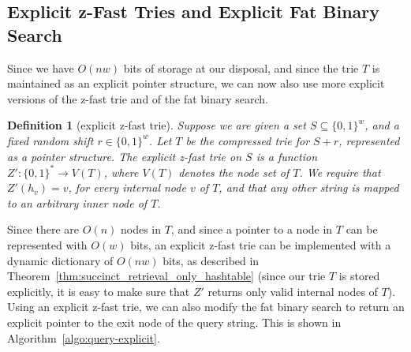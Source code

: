 \documentclass[a4paper,11pt]{article}
\newtheorem{definition}[theorem]{Definition}
\newcommand{\eps}{\varepsilon}
\newcommand{\?}{\mskip1.5mu}
\DeclareMathOperator{\exit}{exit}
\begin{document}
\subsection{Explicit z-Fast Tries and Explicit Fat Binary Search}

Since we have $O(nw)$ bits of storage at our
disposal, and since the trie $T$ is maintained
as an explicit pointer structure, we can now
also use more explicit versions of the z-fast trie
and of the fat binary search.

\begin{definition}[explicit z-fast trie]
Suppose we are given a set $S \subseteq \{0, 1\}^w$, and a fixed
random shift $r \in \{0, 1\}^w$. Let $T$ be the 
compressed trie for $S + r$, represented as a pointer structure. 
The \emph{explicit z-fast trie on $S$} is 
a function $Z' : \{0, 1\}^* \rightarrow V(T)$, where
$V(T)$ denotes the node set of $T$. We require that
$Z'(h_v) = v$, for every internal node $v$ of $T$,
and that any other string is mapped to an arbitrary
inner node of $T$.
\end{definition}

\begin{algorithm}
\KwOut{a pointer to $\exit(q)$}
\If{$a = 0 \wedge e_\text{root}\neq\eps$}{%
  \Return the root of $T$\;
} 
\caption{Explicit fat binary search in order to 
  determine a pointer to $\exit(q)$.}
\label{algo:query-explicit}
\end{algorithm}

Since there are $O(n)$ nodes in $T$, and since a pointer
to a node in $T$ can be represented with $O(w)$ bits,
an explicit z-fast trie can be implemented with a dynamic
dictionary of $O(nw)$ bits, as described in 
Theorem~\ref{thm:succinct_retrieval_only_hashtable} (since
our trie $T$ is stored explicitly, it is easy to make
sure that $Z'$ returns only valid internal nodes
of $T$). Using
an explicit z-fast trie, we can also modify the fat binary
search to return an explicit pointer
to the exit node of the query string. 
This is shown in Algorithm~\ref{algo:query-explicit}.
\end{document}

